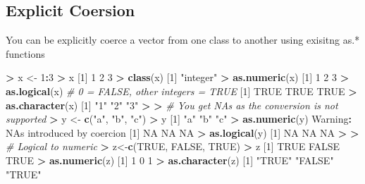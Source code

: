 \documentclass[]{article}
\newenvironment{Shaded}{\begin{snugshade}}{\end{snugshade}}
\newcommand{\KeywordTok}[1]{\textcolor[rgb]{0.13,0.29,0.53}{\textbf{#1}}}
\newcommand{\DecValTok}[1]{\textcolor[rgb]{0.00,0.00,0.81}{#1}}
\newcommand{\StringTok}[1]{\textcolor[rgb]{0.31,0.60,0.02}{#1}}
\newcommand{\CommentTok}[1]{\textcolor[rgb]{0.56,0.35,0.01}{\textit{#1}}}
\newcommand{\OtherTok}[1]{\textcolor[rgb]{0.56,0.35,0.01}{#1}}
\newcommand{\OperatorTok}[1]{\textcolor[rgb]{0.81,0.36,0.00}{\textbf{#1}}}
\newcommand{\ErrorTok}[1]{\textcolor[rgb]{0.64,0.00,0.00}{\textbf{#1}}}
\newcommand{\NormalTok}[1]{#1}
\begin{document}
\subsection{Explicit Coersion}\label{explicit-coersion}

You can be explicitly coerce a vector from one class to another using
exisitng as.* functions

\begin{Shaded}
\begin{Highlighting}[]
\OperatorTok{>}\StringTok{ }\NormalTok{x <-}\StringTok{ }\DecValTok{1}\OperatorTok{:}\DecValTok{3}  
\OperatorTok{>}\StringTok{ }\NormalTok{x}
\NormalTok{[}\DecValTok{1}\NormalTok{] }\DecValTok{1} \DecValTok{2} \DecValTok{3}
\OperatorTok{>}\StringTok{ }\KeywordTok{class}\NormalTok{(x) }
\NormalTok{[}\DecValTok{1}\NormalTok{] }\StringTok{"integer"}
\OperatorTok{>}\StringTok{ }\KeywordTok{as.numeric}\NormalTok{(x) }
\NormalTok{[}\DecValTok{1}\NormalTok{] }\DecValTok{1} \DecValTok{2} \DecValTok{3}
\OperatorTok{>}\StringTok{ }\KeywordTok{as.logical}\NormalTok{(x)  }\CommentTok{# 0 = FALSE, other integers = TRUE}
\NormalTok{[}\DecValTok{1}\NormalTok{] }\OtherTok{TRUE} \OtherTok{TRUE} \OtherTok{TRUE}
\OperatorTok{>}\StringTok{ }\KeywordTok{as.character}\NormalTok{(x)}
\NormalTok{[}\DecValTok{1}\NormalTok{] }\StringTok{"1"} \StringTok{"2"} \StringTok{"3"}
\OperatorTok{>}\StringTok{ }
\ErrorTok{>}\StringTok{ }\CommentTok{# You get NAs as the conversion is not supported}
\ErrorTok{>}\StringTok{ }\NormalTok{y <-}\StringTok{ }\KeywordTok{c}\NormalTok{(}\StringTok{"a"}\NormalTok{, }\StringTok{"b"}\NormalTok{, }\StringTok{"c"}\NormalTok{) }
\OperatorTok{>}\StringTok{ }\NormalTok{y}
\NormalTok{[}\DecValTok{1}\NormalTok{] }\StringTok{"a"} \StringTok{"b"} \StringTok{"c"}
\OperatorTok{>}\StringTok{ }\KeywordTok{as.numeric}\NormalTok{(y) }
\NormalTok{Warning}\OperatorTok{:}\StringTok{ }\NormalTok{NAs introduced by coercion}
\NormalTok{[}\DecValTok{1}\NormalTok{] }\OtherTok{NA} \OtherTok{NA} \OtherTok{NA}
\OperatorTok{>}\StringTok{ }\KeywordTok{as.logical}\NormalTok{(y) }
\NormalTok{[}\DecValTok{1}\NormalTok{] }\OtherTok{NA} \OtherTok{NA} \OtherTok{NA}
\OperatorTok{>}\StringTok{ }
\ErrorTok{>}\StringTok{ }\CommentTok{# Logical to numeric}
\ErrorTok{>}\StringTok{ }\NormalTok{z<-}\KeywordTok{c}\NormalTok{(}\OtherTok{TRUE}\NormalTok{, }\OtherTok{FALSE}\NormalTok{, }\OtherTok{TRUE}\NormalTok{)}
\OperatorTok{>}\StringTok{ }\NormalTok{z}
\NormalTok{[}\DecValTok{1}\NormalTok{]  }\OtherTok{TRUE} \OtherTok{FALSE}  \OtherTok{TRUE}
\OperatorTok{>}\StringTok{ }\KeywordTok{as.numeric}\NormalTok{(z)}
\NormalTok{[}\DecValTok{1}\NormalTok{] }\DecValTok{1} \DecValTok{0} \DecValTok{1}
\OperatorTok{>}\StringTok{ }\KeywordTok{as.character}\NormalTok{(z)}
\NormalTok{[}\DecValTok{1}\NormalTok{] }\StringTok{"TRUE"}  \StringTok{"FALSE"} \StringTok{"TRUE"} 
\end{Highlighting}
\end{Shaded}
\end{document}
